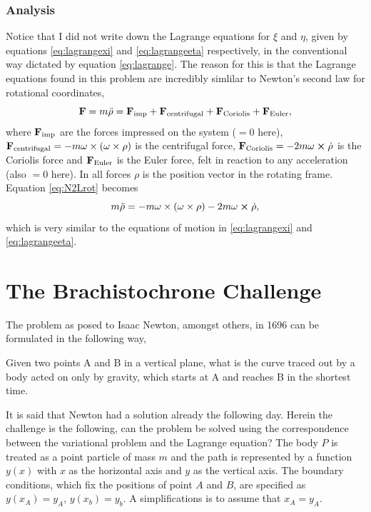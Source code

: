 \documentclass[11pt]{amsart}
\begin{document}
\subsubsection{Analysis}
Notice that I did not write down the Lagrange equations for $\xi$ and $\eta$, given by equations \ref{eq:lagrangexi} and \ref{eq:lagrangeeta} respectively, in the conventional way dictated by equation \ref{eq:lagrange}. The reason for this is that the Lagrange equations found in this problem are incredibly simlilar to Newton's second law for rotational coordinates,
\begin{equation}
\label{eq:N2Lrot}
\vb{F} = m \ddot{\vb{\rho}} = \vb{F}_{\text{imp}} + \vb{F}_{\text{centrifugal}} + \vb{F}_{\text{Coriolis}} + \vb{F}_{\text{Euler}},
\end{equation}
where $\vb{F}_{\text{imp}}$ are the forces impressed on the system ($=0$ here), $\vb{F}_{\text{centrifugal}}= -m\vb{\omega}\times(\vb{\omega}\times\vb{\rho})$ is the centrifugal force, $\vb{F}_{\text{Coriolis}} = -2m\vb{\omega}\cross\dot{\vb{\rho}}$ is the Coriolis force and $\vb{F}_{\text{Euler}}$ is the Euler force, felt in reaction to any acceleration (also $=0$ here). In all forces $\rho$ is the position vector in the rotating frame. Equation \ref{eq:N2Lrot} becomes
\begin{equation}
\label{eq:N2Lrot2}
m \ddot{\vb{\rho}} = -m\vb{\omega}\times(\vb{\omega}\times\vb{\rho}) - 2m\vb{\omega}\cross\dot{\vb{\rho}},
\end{equation}
which is very similar to the equations of motion in \ref{eq:lagrangexi} and \ref{eq:lagrangeeta}.

\section{The Brachistochrone Challenge}
The problem as posed to Isaac Newton, amongst others, in 1696 can be formulated in the following way,

\begin{displayquote}
Given two points A and B in a vertical plane, what is the curve
traced out by a body acted on only by gravity, which starts at
A and reaches B in the shortest time.
\end{displayquote}

It is said that Newton had a solution already the following day. Herein the challenge is the following, can the problem be solved using the correspondence between the variational problem and the Lagrange equation? The body $P$ is treated as a point particle of mass $m$ and the path is represented by a function $y(x)$ with $x$ as the horizontal axis and $y$ as the vertical axis. The boundary conditions, which fix the positions of point $A$ and $B$, are specified as $y(x_A) = y_A$, $y(x_b) = y_b$. A simplifications is to assume that $x_A = y_A$.
\end{document}
